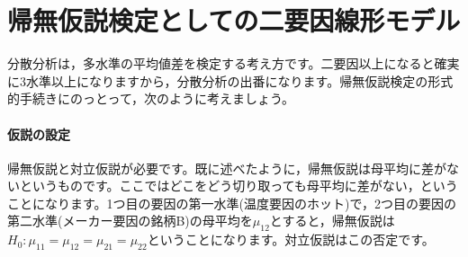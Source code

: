 \documentclass{ltjsarticle}
\begin{document}
\section{帰無仮説検定としての二要因線形モデル}
分散分析は，多水準の平均値差を検定する考え方です。二要因以上になると確実に3水準以上になりますから，分散分析の出番になります。帰無仮説検定の形式的手続きにのっとって，次のように考えましょう。
\paragraph{仮説の設定}帰無仮説と対立仮説が必要です。既に述べたように，帰無仮説は母平均に差がないというものです。ここではどこをどう切り取っても母平均に差がない，ということになります。1つ目の要因の第一水準(温度要因のホット)で，2つ目の要因の第二水準(メーカー要因の銘柄B)の母平均を$\mu_{12}$とすると，帰無仮説は$H_0:\mu_{11}=\mu_{12}=\mu_{21}=\mu_{22}$ということになります。対立仮説はこの否定です。
\end{document}
